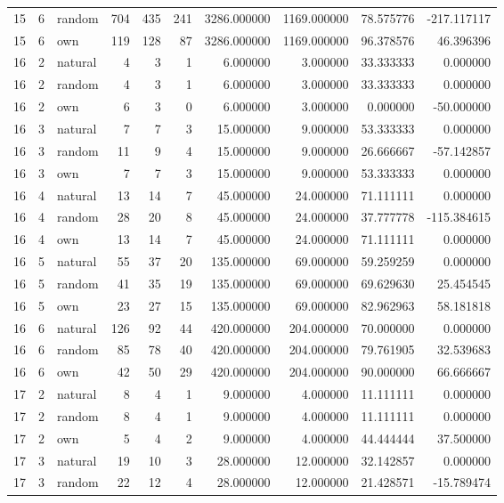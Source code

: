 \begin{table}[htbp]
\begin{tabular}{rrlrrrrrrr}
15 & 6 & random & 704 & 435 & 241 & 3286.000000 & 1169.000000 & 78.575776 & -217.117117 \\
15 & 6 & own & 119 & 128 & 87 & 3286.000000 & 1169.000000 & 96.378576 & 46.396396 \\
16 & 2 & natural & 4 & 3 & 1 & 6.000000 & 3.000000 & 33.333333 & 0.000000 \\
16 & 2 & random & 4 & 3 & 1 & 6.000000 & 3.000000 & 33.333333 & 0.000000 \\
16 & 2 & own & 6 & 3 & 0 & 6.000000 & 3.000000 & 0.000000 & -50.000000 \\
16 & 3 & natural & 7 & 7 & 3 & 15.000000 & 9.000000 & 53.333333 & 0.000000 \\
16 & 3 & random & 11 & 9 & 4 & 15.000000 & 9.000000 & 26.666667 & -57.142857 \\
16 & 3 & own & 7 & 7 & 3 & 15.000000 & 9.000000 & 53.333333 & 0.000000 \\
16 & 4 & natural & 13 & 14 & 7 & 45.000000 & 24.000000 & 71.111111 & 0.000000 \\
16 & 4 & random & 28 & 20 & 8 & 45.000000 & 24.000000 & 37.777778 & -115.384615 \\
16 & 4 & own & 13 & 14 & 7 & 45.000000 & 24.000000 & 71.111111 & 0.000000 \\
16 & 5 & natural & 55 & 37 & 20 & 135.000000 & 69.000000 & 59.259259 & 0.000000 \\
16 & 5 & random & 41 & 35 & 19 & 135.000000 & 69.000000 & 69.629630 & 25.454545 \\
16 & 5 & own & 23 & 27 & 15 & 135.000000 & 69.000000 & 82.962963 & 58.181818 \\
16 & 6 & natural & 126 & 92 & 44 & 420.000000 & 204.000000 & 70.000000 & 0.000000 \\
16 & 6 & random & 85 & 78 & 40 & 420.000000 & 204.000000 & 79.761905 & 32.539683 \\
16 & 6 & own & 42 & 50 & 29 & 420.000000 & 204.000000 & 90.000000 & 66.666667 \\
17 & 2 & natural & 8 & 4 & 1 & 9.000000 & 4.000000 & 11.111111 & 0.000000 \\
17 & 2 & random & 8 & 4 & 1 & 9.000000 & 4.000000 & 11.111111 & 0.000000 \\
17 & 2 & own & 5 & 4 & 2 & 9.000000 & 4.000000 & 44.444444 & 37.500000 \\
17 & 3 & natural & 19 & 10 & 3 & 28.000000 & 12.000000 & 32.142857 & 0.000000 \\
17 & 3 & random & 22 & 12 & 4 & 28.000000 & 12.000000 & 21.428571 & -15.789474 \\

\end{tabular}
\end{table}
